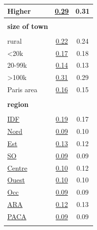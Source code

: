 \documentclass[english,5p,authoryear]{elsarticle}
\begin{document}
\begin{appendices}
\begin{table}[!htbp]
\begin{tabular}{lcc}
Higher & \uline{0.29} & 0.31\tabularnewline
\hline  \\[-1.8ex]
\textbf{size of town} &  & \tabularnewline  \\[-1.8ex]
rural & \uline{0.22} & 0.24\tabularnewline
<20k & \uline{0.17} & 0.18\tabularnewline
20-99k & \uline{0.14} & 0.13\tabularnewline
>100k & \uline{0.31} & 0.29\tabularnewline
Paris area & \uline{0.16} & 0.15\tabularnewline
\hline  \\[-1.8ex]
\textbf{region} &  & \tabularnewline  \\[-1.8ex]
\uline{IDF} & \uline{0.19} & 0.17\tabularnewline
 \uline{Nord} & \uline{0.09} & 0.10\tabularnewline
 \uline{Est} & \uline{0.13} & 0.12\tabularnewline
\uline{SO} & \uline{0.09} & 0.09\tabularnewline
\uline{Centre} & \uline{0.10} & 0.12\tabularnewline
 \uline{Ouest} & \uline{0.10} & 0.10\tabularnewline
 \uline{Occ} & \uline{0.09} & 0.09\tabularnewline
\uline{ARA} & \uline{0.12} & 0.13\tabularnewline
\uline{PACA} & \uline{0.09} & 0.09\tabularnewline  \\[-1.8ex]
\hline \hline 
\end{tabular}\bigskip{}
\end{table}



\end{appendices}
\end{document}
